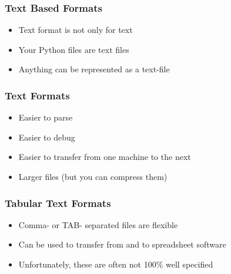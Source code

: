 
\begin{frame}[fragile]
\frametitle{Text Based Formats}

\begin{itemize}
\item Text format is not only for text
\item Your Python files are text files
\item Anything can be represented as a text-file
\end{itemize}

\end{frame}

\begin{frame}[fragile]
\frametitle{Text Formats}

\begin{itemize}
\item Easier to parse
\item Easier to debug
\item Easier to transfer from one machine to the next
\item Larger files (but you can compress them)
\end{itemize}
\end{frame}

\begin{frame}[fragile]
\frametitle{Tabular Text Formats}

\begin{itemize}
\item Comma- or TAB- separated files are flexible
\item Can be used to transfer from and to spreadsheet software
\item Unfortunately, these are often not 100\% well specified
\end{itemize}
\end{frame}

